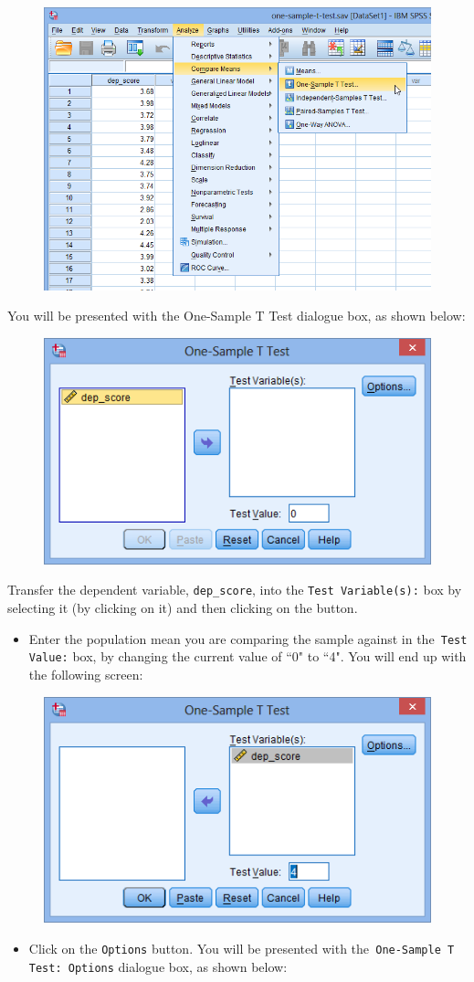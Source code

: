 \documentclass[]{article}
\begin{document}
\begin{figure}[h!]
\centering
\includegraphics[width=0.45\linewidth]{OneSample/OneSample1}

\label{fig:OneSample1}
\end{figure}

\noindent You will be presented with the One-Sample T Test dialogue box, as shown below:


\begin{figure}[h!]
	\centering
	\includegraphics[width=0.5\linewidth]{OneSample/OneSample2}
	\label{fig:OneSample2}
\end{figure}
\newpage
\noindent Transfer the dependent variable, \texttt{dep\_score}, into the \texttt{Test Variable(s):} box by selecting it (by clicking on it) and then clicking on the  button.  \smallskip

\begin{itemize}
	\item \noindent Enter the population mean you are comparing the sample against in the\texttt{ Test Value:} box, by changing the current value of ``0" to ``4". You will end up with the following screen:
\end{itemize}



\begin{figure}[h!]
	\centering
	\includegraphics[width=0.5\linewidth]{OneSample/OneSample3}
	\label{fig:OneSample3}
\end{figure}
\begin{itemize}
	\item Click on the \texttt{Options} button. You will be presented with the\texttt{ One-Sample T Test: Options} dialogue box, as shown below:
\end{itemize}
\end{document}
